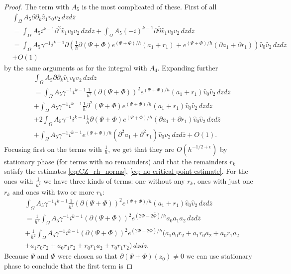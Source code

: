 \documentclass[a4paper, 10pt, twoside, notitlepage]{amsart}
\theoremstyle{plain}
\newcommand{\Om}{\Omega}
\numberwithin{equation}{section}
\newcommand {\p} {\partial}
\newcommand{\e}{\epsilon}
\newcommand{\dbar}{\ol{\p}}
\newcommand{\ol}[1]{\overline{#1}}
\newcommand{\oz}{\overline{z}}
\begin{document}
\begin{proof}
	The term with $A_5$ is the most complicated of these. First of all
	\begin{align*}
		&\int_{\Om}A_5\p\p_k \hat{v}_1v_0v_2\,dzd\oz\\
		&= \int_{\Om}A_5i^{k-1}\p^2\hat{v}_1v_0v_2\,dzd\oz + \int_{\Om}A_5(-i)^{k-1}\p\dbar \hat{v}_1 v_0v_2\,dzd\oz\\
		&= \int_{\Om}A_5\gamma^{-1}i^{k-1}\p\left(\frac{1}{h}\p(\Psi + \Phi)e^{(\Psi + \Phi)/h}(a_1+r_1) + e^{(\Psi + \Phi)/h}(\p a_1 + \p r_1)\right) \hat{v}_0\hat{v}_2\,dzd\oz\\
		&+ O(1)
	\end{align*}
	by the same arguments as for the integral with $A_4$. Expanding further
	\begin{align*}
		&\int_{\Om}A_5\p\p_k \hat{v}_1v_0v_2\,dzd\oz\\
		&= \int_{\Om}A_5\gamma^{-1}i^{k-1}\frac{1}{h^2}(\p(\Psi + \Phi))^2e^{(\Psi + \Phi)/h}(a_1+r_1)\hat{v}_0\hat{v}_2\,dzd\oz\\
		&+ \int_{\Om}A_5\gamma^{-1}i^{k-1}\frac{1}{h}\p^2(\Psi + \Phi)e^{(\Psi + \Phi)/h}(a_1+r_1)\hat{v}_0\hat{v}_2\,dzd\oz\\
		&+ 2\int_{\Om}A_5\gamma^{-1}i^{k-1}\frac{1}{h}\p(\Psi + \Phi)e^{(\Psi + \Phi)/h}(\p a_1+\p r_1)\hat{v}_0\hat{v}_2\,dzd\oz\\
		&+ \int_{\Om}A_5\gamma^{-1}i^{k-1}e^{(\Psi + \Phi)/h}(\p^2a_1+\p^2r_1)\hat{v}_0\hat{v}_2\,dzd\oz + O(1).
	\end{align*}
	Focusing first on the terms with $\frac{1}{h}$, we get that they are $O(h^{-1/2+\e})$ by stationary phase (for terms with no remainders) and that the remainders $r_k$ satisfy the estimates \eqref{eq:CZ_rh_norms}, \eqref{eq: no critical point estimate}. For the ones with $\frac{1}{h^2}$ we have three kinds of terms: one without any $r_k$, ones with just one $r_k$ and ones with two or more $r_k$:
	\begin{align*}
		&\int_{\Om}A_5\gamma^{-1}i^{k-1}\frac{1}{h^2}(\p(\Psi + \Phi))^2e^{(\Psi + \Phi)/h}(a_1+r_1)\hat{v}_0\hat{v}_2\,dzd\oz\\
		&= \frac{1}{h^2}\int_{\Om}A_5\gamma^{-1}i^{k-1}(\p(\Psi + \Phi))^2e^{(2\Phi - 2\ol{\Phi})/h}a_0a_1a_2\,dzd\oz\\
		&+ \frac{1}{h^2}\int_{\Om}A_5\gamma^{-1}i^{k-1}(\p(\Psi + \Phi))^2e^{(2\Phi - 2\ol{\Phi})/h}\Big(a_1a_0r_2 + a_1r_0a_2 + a_0r_1a_2 \\
		&+ a_1r_0r_2 + a_0r_1r_2 + r_0r_1a_2 + r_0r_1r_2\Big)\,dzd\oz.
	\end{align*}
	Because $\Psi$ and $\Phi$ were chosen so that $\p(\Psi + \Phi)(z_0) \neq 0$ we can use stationary phase to conclude that the first term is

\end{proof}
\end{document}

